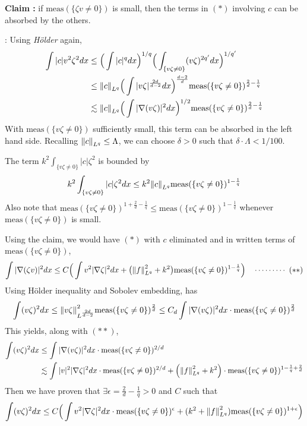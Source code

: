 \documentclass[12pt,a4paper]{article}
\newenvironment{proof}
{\begin{changemargin}{0.5cm}{0.5cm} 
	}%
	{\end{changemargin}
}
\newenvironment{subproof}
{\begin{changemargin}{0.5cm}{0.5cm} 
	}%
	{\end{changemargin}
}
\newenvironment{p}
{\begin{proof} 
	}%
	{\end{proof}
}
\begin{document}
\begin{p}
\textbf{Claim :} if $\text{meas}(\{\zeta v\neq 0\})$ is small, then the terms in $(*)$ involving $c$ can be absorbed by the others. 
\begin{subproof}
: Using \emph{H\"older} again,
\begin{align*}
\int |c| v^2 \zeta^2 dx & \leq \Big( \int |c|^q dx\Big)^{1/q} \Big( \int_{\{v\zeta \neq 0\}} (v\zeta)^{2q'} dx\Big)^{1/q'} \\
& \leq \snorms{c}{L^q} \Big( \int |v\zeta|^{\frac{2d}{d-2}} dx\Big)^{\frac{d-2}{d}} \text{meas}(\{v\zeta \neq 0\})^{\frac{2}{d} - \frac{1}{q}} \\
& \lesssim \snorms{c}{L^q} \Big( \int |\nabla (v\zeta)|^{2} dx\Big)^{1/2} \text{meas}(\{v\zeta \neq 0\})^{\frac{2}{d} - \frac{1}{q}}
\end{align*}
With $\text{meas}(\{v\zeta \neq 0 \})$ sufficiently small, this term can be absorbed in the left hand side. Recalling $\snorms{c}{L^q} \leq \Lambda$, we can choose $\delta >0$ such that $\delta \cdot \Lambda < 1/100$.

\quad The term $k^2 \int_{\{v\zeta \neq 0 \}} |c| \zeta^2$ is bounded by
\begin{align*}
k^2 \int_{\{v\zeta \neq 0 \}} |c| \zeta^2 dx \leq k^2 \snorms{c}{L^q} \text{meas}(\{v\zeta \neq 0\})^{1- \frac{1}{q}}
\end{align*}
Also note that $\text{meas}(\{v\zeta \neq 0 \})^{1 + \frac{2}{d} - \frac{1}{q}} \leq \text{meas}(\{v\zeta \neq 0 \})^{1-\frac{1}{q}}$ whenever $\text{meas}(\{v\zeta \neq 0 \})$ is small.
\end{subproof}
Using the claim, we would have $(*)$ with $c$ eliminated and in written terms of $\text{meas}(\{v\zeta \neq 0\})$, 
\begin{align*}
\int |\nabla (\zeta v)|^2 dx \leq C \Big( \int v^2 |\nabla \zeta|^2 dx + \big( \snorms{f}{L^q}^2 + k^2 \big) \text{meas}(\{v\zeta \neq 0 \})^{1-\frac{1}{q}}\Big) \call{**} 
\end{align*}
Using H\"older inequality and Sobolev embedding, has
\begin{align*}
\int (v\zeta)^2 dx \leq \snorms{v\zeta}{L^{\frac{2d}{d-2}}}^2 \text{meas}(\{v\zeta \neq 0 \})^{\frac{2}{d}} \leq C_d \int |\nabla(v\zeta)|^2 dx \cdot \text{meas}(\{v\zeta \neq 0 \})^{\frac{2}{d}}
\end{align*}
This yields, along with $(**)$,
\begin{align*}
\int (v\zeta)^2 dx &\leq \int |\nabla (v\zeta )|^2 dx \cdot \text{meas}(\{v\zeta \neq 0\})^{2/d} \\
& \lesssim \int |v|^2 |\nabla \zeta|^2 dx \cdot \text{meas}(\{v\zeta \neq 0\})^{2/d} + \Big( \snorms{f}{L^q}^2 +k^2 \Big) \cdot \text{meas}(\{v\zeta \neq 0\})^{1- \frac{1}{q} + \frac{2}{d}}
\end{align*}
Then we have proven that $\exists \epsilon = \frac{2}{d} - \frac{1}{q} >0$ and $C$ such that
\begin{align*}
\int (v\zeta)^2 dx \leq C\Big( \int v^2 |\nabla \zeta|^2 dx \cdot \text{meas}(\{v\zeta \neq 0\})^{\epsilon} + (k^2 + \snorms{f}{L^q}^2) \text{meas}(\{v\zeta \neq 0\})^{1+ \epsilon} \Big)
\end{align*}


\end{p}
\end{document}
